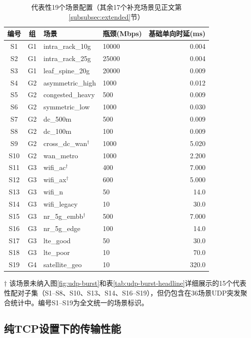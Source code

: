 \documentclass[10pt,twocolumn]{article}
\begin{document}
\begin{table}[htbp]
\centering
\caption{代表性19个场景配置（其余17个补充场景见正文第\ref{subsubsec:extended}节）}
\label{tab:scenarios}
\footnotesize
\setlength{\tabcolsep}{3.5pt}
\begin{tabular}{@{}ccllr@{}}
\toprule
\textbf{编号} & \textbf{组} & \textbf{场景} & \textbf{瓶颈(Mbps)} & \textbf{基础单向时延(ms)} \\
\midrule
S1 & G1 & intra\_rack\_10g & 10000 & 0.004 \\
S2 & G1 & intra\_rack\_25g & 25000 & 0.004 \\
S3 & G1 & leaf\_spine\_20g & 20000 & 0.009 \\
\midrule
S4 & G2 & asymmetric\_high & 1000 & 0.012 \\
S5 & G2 & congested\_heavy & 500 & 0.009 \\
S6 & G2 & symmetric\_low & 1000 & 0.030 \\
S7 & G2 & dc\_500m & 500 & 0.009 \\
S8 & G2 & dc\_100m & 100 & 0.009 \\
S9 & G2 & cross\_dc\_wan$^{\dagger}$ & 1000 & 5.020 \\
S10 & G2 & wan\_metro & 1000 & 2.200 \\
\midrule
S11 & G3 & wifi\_ac$^{\dagger}$ & 400 & 7.000 \\
S12 & G3 & wifi\_ax$^{\dagger}$ & 600 & 5.000 \\
S13 & G3 & wifi\_n & 50 & 14.0 \\
S14 & G3 & wifi\_legacy & 10 & 30.0 \\
S15 & G3 & nr\_5g\_embb$^{\dagger}$ & 500 & 7.000 \\
S16 & G3 & nr\_5g\_edge & 100 & 14.0 \\
S17 & G3 & lte\_good & 50 & 30.0 \\
S18 & G3 & lte\_poor & 10 & 70.0 \\
\midrule
S19 & G4 & satellite\_geo & 10 & 320.0 \\
\bottomrule
\end{tabular}
\vspace{2pt}

\raggedright
\scriptsize $\dagger$ 该场景未纳入图\ref{fig:udp-burst}和表\ref{tab:udp-burst-headline}详细展示的15个代表性配对子集（S1--S8、S10、S13、S14、S16--S19），但仍包含在36场景UDP突发聚合统计中。编号S1--S19为全文统一的场景标识。
\end{table}

\subsection{纯TCP设置下的传输性能}
\label{subsec:main-results}
\end{document}
